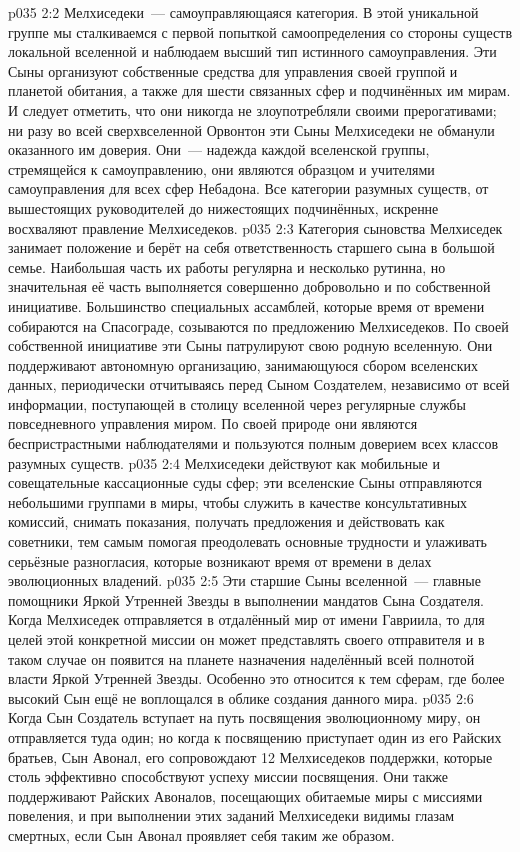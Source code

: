 \vs p035 2:2 Мелхиседеки~--- самоуправляющаяся категория. В этой уникальной группе мы сталкиваемся с первой попыткой самоопределения со стороны существ локальной вселенной и наблюдаем высший тип истинного самоуправления. Эти Сыны организуют собственные средства для управления своей группой и планетой обитания, а также для шести связанных сфер и подчинённых им мирам. И следует отметить, что они никогда не злоупотребляли своими прерогативами; ни разу во всей сверхвселенной Орвонтон эти Сыны Мелхиседеки не обманули оказанного им доверия. Они~--- надежда каждой вселенской группы, стремящейся к самоуправлению, они являются образцом и учителями самоуправления для всех сфер Небадона. Все категории разумных существ, от вышестоящих руководителей до нижестоящих подчинённых, искренне восхваляют правление Мелхиседеков.
\vs p035 2:3 \pc Категория сыновства Мелхиседек занимает положение и берёт на себя ответственность старшего сына в большой семье. Наибольшая часть их работы регулярна и несколько рутинна, но значительная её часть выполняется совершенно добровольно и по собственной инициативе. Большинство специальных ассамблей, которые время от времени собираются на Спасограде, созываются по предложению Мелхиседеков. По своей собственной инициативе эти Сыны патрулируют свою родную вселенную. Они поддерживают автономную организацию, занимающуюся сбором вселенских данных, периодически отчитываясь перед Сыном Создателем, независимо от всей информации, поступающей в столицу вселенной через регулярные службы повседневного управления миром. По своей природе они являются беспристрастными наблюдателями и пользуются полным доверием всех классов разумных существ.
\vs p035 2:4 Мелхиседеки действуют как мобильные и совещательные кассационные суды сфер; эти вселенские Сыны отправляются небольшими группами в миры, чтобы служить в качестве консультативных комиссий, снимать показания, получать предложения и действовать как советники, тем самым помогая преодолевать основные трудности и улаживать серьёзные разногласия, которые возникают время от времени в делах эволюционных владений.
\vs p035 2:5 Эти старшие Сыны вселенной~--- главные помощники Яркой Утренней Звезды в выполнении мандатов Сына Создателя. Когда Мелхиседек отправляется в отдалённый мир от имени Гавриила, то для целей этой конкретной миссии он может представлять своего отправителя и в таком случае он появится на планете назначения наделённый всей полнотой власти Яркой Утренней Звезды. Особенно это относится к тем сферам, где более высокий Сын ещё не воплощался в облике создания данного мира.
\vs p035 2:6 Когда Сын Создатель вступает на путь посвящения эволюционному миру, он отправляется туда один; но когда к посвящению приступает один из его Райских братьев, Сын Авонал, его сопровождают 12 Мелхиседеков поддержки, которые столь эффективно способствуют успеху миссии посвящения. Они также поддерживают Райских Авоналов, посещающих обитаемые миры с миссиями повеления, и при выполнении этих заданий Мелхиседеки видимы глазам смертных, если Сын Авонал проявляет себя таким же образом.
